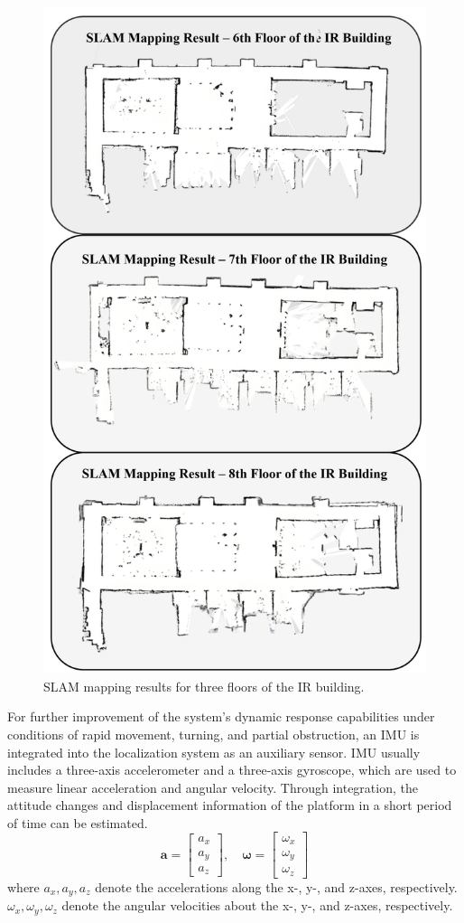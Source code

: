 \documentclass[12pt,a4paper]{article}
\numberwithin{equation}{section}
\begin{document}
\begin{figure}[H]
    \centering
    \includegraphics[width=0.48\linewidth]{images/slam.png}
    \caption{SLAM mapping results for three floors of the IR building.}
    \label{fig:SLAM Mapping Results on the 6th, 7th and 8th Floors of the IR Building}
\end{figure}
\noindent For further improvement of the system's dynamic response capabilities under conditions of rapid movement, turning, and partial obstruction, an IMU is integrated into the localization system as an auxiliary sensor. IMU usually includes a three-axis accelerometer and a three-axis gyroscope, which are used to measure linear acceleration and angular velocity. Through integration, the attitude changes and displacement information of the platform in a short period of time can be estimated.
\begin{equation}
\boldsymbol{a} =
\begin{bmatrix}
a_x \\ a_y \\ a_z
\end{bmatrix}, \quad
\boldsymbol{\omega} =
\begin{bmatrix}
\omega_x \\ \omega_y \\ \omega_z
\end{bmatrix}
\end{equation}
\noindent where $a_x, a_y, a_z$ denote the accelerations along the x-, y-, and z-axes, respectively. $\omega_x, \omega_y, \omega_z$ denote the angular velocities about the x-, y-, and z-axes, respectively.\\
\end{document}
